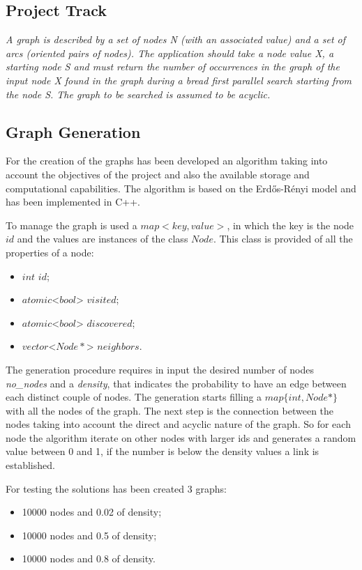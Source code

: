 \subsection{Project Track}
\textit{A graph is described by a set of nodes N (with an associated value) and a set of arcs (oriented pairs of nodes). The application should take a node value X, a starting node S and must return the number of occurrences in the graph of the input node X found in the graph during a bread first parallel search starting from the node S. The graph to be searched is assumed to be acyclic.}

\subsection{Graph Generation}
\label{sec:graph}
For the creation of the graphs has been developed an algorithm taking into account the objectives of the project and also the available storage and computational capabilities. The algorithm is based on the Erdős-Rényi model and has been implemented in C++.

To manage the graph is used a $map<key, value>$, in which the key is the node $id$ and the values are instances of the class $Node$. This class is provided of all the properties of a node:

\begin{itemize}
    \item $int$ $id$;
    \item $atomic$<$bool$> $visited$;
    \item $atomic$<$bool$> $discovered$;
    \item $vector$<$Node*$> $neighbors$.
\end{itemize}

The generation procedure requires in input the desired number of nodes \textit{no\_nodes} and a \textit{density}, that indicates the probability to have an edge between each distinct couple of nodes.  The generation starts filling a $map\{int, Node*\}$ with all the nodes of the graph. The next step is the connection between the nodes taking into account the direct and acyclic nature of the graph. So for each node the algorithm iterate on other nodes with larger ids and generates a random value between 0 and 1, if the number is below the density values a link is established. 

For testing the solutions has been created 3 graphs:
\begin{itemize}
    \item 10000 nodes and 0.02 of density;
    \item 10000 nodes and 0.5 of density;
    \item 10000 nodes and 0.8 of density.
\end{itemize}

